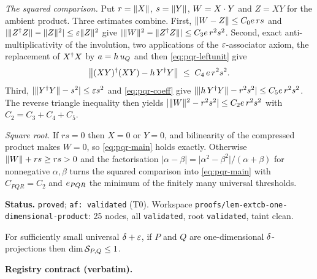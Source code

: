 \emph{The squared comparison.} Put $r=\lVert X\rVert$, $s=\lVert Y\rVert$, $W=X\mathbin{\cdot} Y$ and $Z=XY$ for
the ambient product. Three estimates combine. First,
$\lVert W-Z\rVert\le C_0e\,rs$ and $\lvert\lVert Z^{\dagger} Z\rVert-\lVert Z\rVert^{2}\rvert\le\varepsilon\lVert Z\rVert^{2}$
give $\lvert\lVert W\rVert^{2}-\lVert Z^{\dagger} Z\rVert\rvert\le C_3e\,r^{2}s^{2}$. Second, exact
anti-multiplicativity of the involution, two applications of the $\varepsilon$-associator axiom,
the replacement of $X^{\dagger} X$ by $a=h\,u_{Q}$ and then \eqref{eq:pqr-leftunit} give
\begin{equation}\label{eq:pqr-assoc}
  \bigl\lVert(XY)^{\dagger}(XY)-h\,Y^{\dagger} Y\bigr\rVert\;\le\;C_4\,e\,r^{2}s^{2}.
\end{equation}
Third, $\lvert\lVert Y^{\dagger} Y\rVert-s^{2}\rvert\le\varepsilon s^{2}$ and \eqref{eq:pqr-coeff} give
$\lvert\lVert h\,Y^{\dagger} Y\rVert-r^{2}s^{2}\rvert\le C_5e\,r^{2}s^{2}$. The reverse triangle
inequality then yields
$\lvert\lVert W\rVert^{2}-r^{2}s^{2}\rvert\le C_2e\,r^{2}s^{2}$ with $C_2=C_3+C_4+C_5$.

\emph{Square root.} If $rs=0$ then $X=0$ or $Y=0$, and bilinearity of the compressed
product makes $W=0$, so \eqref{eq:pqr-main} holds exactly. Otherwise $\lVert W\rVert+rs\ge rs>0$
and the factorisation $\lvert\alpha-\beta\rvert=\lvert\alpha^{2}-\beta^{2}\rvert/(\alpha+\beta)$
for nonnegative $\alpha,\beta$ turns the squared comparison into \eqref{eq:pqr-main} with
$C_{PQR}=C_2$ and $e_{PQR}$ the minimum of the finitely many universal thresholds.

\medskip
\noindent\textbf{Status.} \texttt{proved}; \texttt{af: validated} (T0). Workspace
\texttt{proofs/lem-extcb-one-dimensional-product}: 25 nodes, all \texttt{validated}, root
\texttt{validated}, taint clean.

\begin{lemma}\label{lem:extcb-one-dimensional-corner-dimension}
For sufficiently small universal $\delta+\varepsilon$, if $P$ and $Q$ are one-dimensional
$\delta$-projections then $\dim\mathcal S_{P,Q}\le1$.
\end{lemma}

\noindent\textbf{Registry contract (verbatim).}

